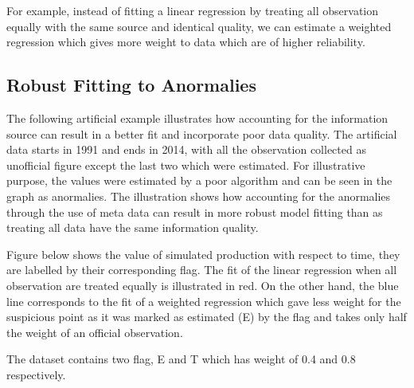 \documentclass[nojss]{jss}\usepackage[]{graphicx}\usepackage[]{color}
\begin{document}
For example, instead of fitting a linear regression by treating all
observation equally with the same source and identical quality, we can
estimate a weighted regression which gives more weight to data which
are of higher reliability.


\subsection{Robust Fitting to Anormalies}
The following artificial example illustrates how accounting for the
information source can result in a better fit and incorporate poor
data quality. The artificial data starts in 1991 and ends in 2014,
with all the observation collected as unofficial figure except the
last two which were estimated. For illustrative purpose, the values
were estimated by a poor algorithm and can be seen in the graph as
anormalies. The illustration shows how accounting for the anormalies
through the use of meta data can result in more robust model fitting
than as treating all data have the same information quality.

Figure below shows the value of simulated production with respect to
time, they are labelled by their corresponding flag. The fit of the
linear regression when all observation are treated equally is
illustrated in red. On the other hand, the blue line corresponds to
the fit of a weighted regression which gave less weight for the
suspicious point as it was marked as estimated (E) by the flag and
takes only half the weight of an official observation.

The dataset contains two flag, E and T which has weight of 0.4 and 0.8
respectively.
\end{document}
